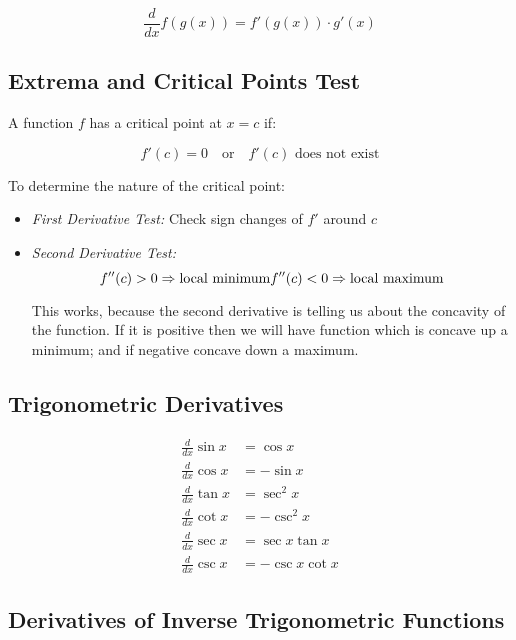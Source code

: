 \[
    \frac{d}{dx} f(g(x)) = f'(g(x)) \cdot g'(x)
\]

\subsection{Extrema and Critical Points Test}

A function \(f\) has a critical point at \(x = c\) if:

\[
    f'(c) = 0 \quad \text{or} \quad f'(c) \text{ does not exist}
\]

To determine the nature of the critical point:

\begin{itemize}

    \item \emph{First Derivative Test:} Check sign changes of \(f'\) around \(c\)

    \item \emph{Second Derivative Test:}
    \[
        f''(c) > 0 \Rightarrow \text{local minimum} \\
        f''(c) < 0 \Rightarrow \text{local maximum}
    \]

    This works, because the second derivative is telling us about the concavity of the function. If it is 
    positive then we will have function which is concave up a minimum; and if negative concave down a maximum. 

\end{itemize}

\subsection{Trigonometric Derivatives}

\begin{align*}
    \frac{d}{dx} \sin x &= \cos x \\
    \frac{d}{dx} \cos x &= -\sin x \\
    \frac{d}{dx} \tan x &= \sec^2 x \\
    \frac{d}{dx} \cot x &= -\csc^2 x \\
    \frac{d}{dx} \sec x &= \sec x \tan x \\
    \frac{d}{dx} \csc x &= -\csc x \cot x
\end{align*}

\subsection{Derivatives of Inverse Trigonometric Functions}


